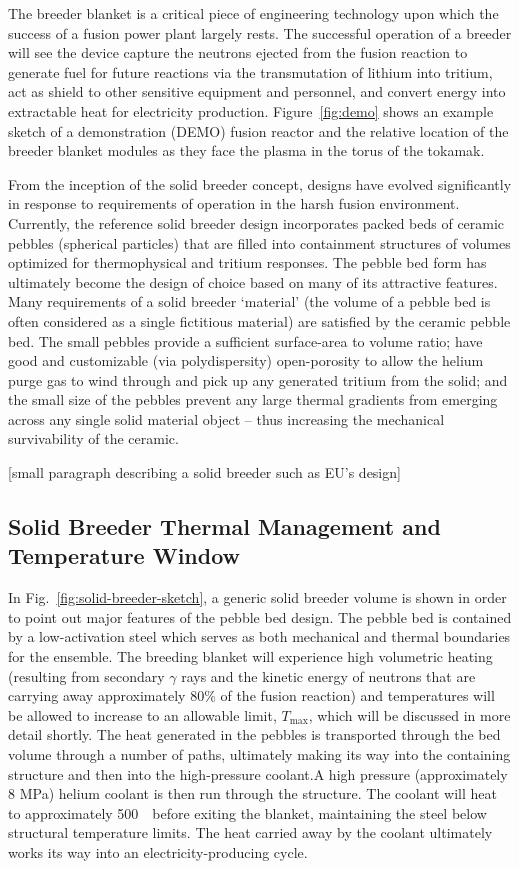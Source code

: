 The breeder blanket is a critical piece of engineering technology upon which the success of a fusion power plant largely rests. The successful operation of a breeder will see the device capture the neutrons ejected from the fusion reaction to generate fuel for future reactions via the transmutation of lithium into tritium, act as shield to other sensitive equipment and personnel, and convert energy into extractable heat for electricity production. Figure~\ref{fig:demo} shows an example sketch of a demonstration (DEMO) fusion reactor and the relative location of the breeder blanket modules as they face the plasma in the torus of the tokamak. 



From the inception of the solid breeder concept, designs have evolved significantly in response to requirements of operation in the harsh fusion environment. Currently, the reference solid breeder design incorporates packed beds of ceramic pebbles (spherical particles) that are filled into containment structures of volumes optimized for thermophysical and tritium responses. The pebble bed form has ultimately become the design of choice based on many of its attractive features. Many requirements of a solid breeder `material' (the volume of a pebble bed is often considered as a single fictitious material) are satisfied by the ceramic pebble bed. The small pebbles provide a sufficient surface-area to volume ratio; have good and customizable (via polydispersity) open-porosity to allow the helium purge gas to wind through and pick up any generated tritium from the solid; and the small size of the pebbles prevent any large thermal gradients from emerging across any single solid material object -- thus increasing the mechanical survivability of the ceramic. 

[small paragraph describing a solid breeder such as EU's design]

\subsection{Solid Breeder Thermal Management and Temperature Window}
In Fig.~\ref{fig:solid-breeder-sketch}, a generic solid breeder volume is shown in order to point out major features of the pebble bed design. The pebble bed is contained by a low-activation steel which serves as both mechanical and thermal boundaries for the ensemble. The breeding blanket will experience high volumetric heating (resulting from secondary $\gamma$ rays and the kinetic energy of neutrons that are carrying away approximately 80\% of the fusion reaction) and temperatures will be allowed to increase to an allowable limit, $T_\text{max}$, which will be discussed in more detail shortly. The heat generated in the pebbles is transported through the bed volume through a number of paths, ultimately making its way into the containing structure and then into the high-pressure coolant.A high pressure (approximately 8 MPa) helium coolant is then run through the structure. The coolant will heat to approximately 500~\celsius~before exiting the blanket, maintaining the steel below structural temperature limits. The heat carried away by the coolant ultimately works its way into an electricity-producing cycle. 

